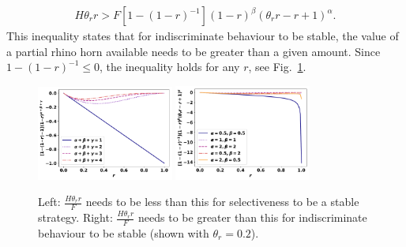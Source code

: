 \documentclass[10pt]{article}
\begin{document}
\begin{eqnarray}
\label{eqn:s0x0_s1x0}
H \theta_r r  > F [1 - (1 - r)^{-1}](1 - r)^{\beta}(\theta_r r - r + 1)^{\alpha}.
\end{eqnarray}
This inequality states that for indiscriminate behaviour to be stable, the value of
a partial rhino horn available needs to be greater than a given amount. Since 
\(1-(1-r)^{-1} \leq 0\), the inequality holds for any \(r\), see 
Fig.~\ref{fig:Inequality}.

\begin{figure}[h]
\centering
\includegraphics[width = 0.4\textwidth]{images/SelectiveInequality}
\includegraphics[width = 0.4\textwidth, height=.275\textwidth]{images/IndiscriminateInequality}
\caption{\label{fig:Inequality} Left: \(\frac{H \theta_r r}{F}\) needs to be less 
than this for selectiveness to be a stable strategy. Right:  \(\frac{H \theta_r r}{F}\)
needs to be greater than this for indiscriminate behaviour to be stable 
(shown with \(\theta_r=0.2\)).}
\end{figure}

\end{document}
